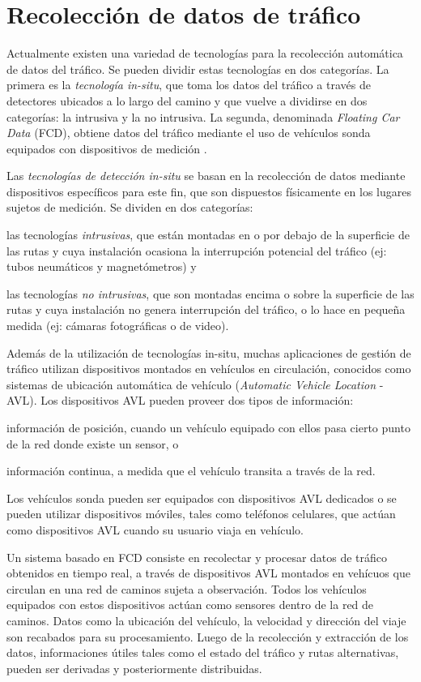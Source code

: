 \section{Recolección de datos de tráfico}
\label{sec:recoleccion_datos}

Actualmente existen una variedad de tecnologías para la recolección automática de datos del tráfico. Se pueden dividir estas tecnologías en dos categorías. La primera es la \emph{tecnología in-situ}, que toma los datos del tráfico a través de detectores ubicados a lo largo del camino y que vuelve a dividirse en dos categorías: la intrusiva y la no intrusiva. La segunda, denominada \emph{Floating Car Data} (FCD), obtiene datos del tráfico mediante el uso de vehículos sonda equipados con dispositivos de medición \cite{mimbela2003summary}.

Las \emph{tecnologías de detección in-situ} se basan en la recolección de datos mediante dispositivos específicos para este fin, que son dispuestos físicamente en los lugares sujetos de medición. Se dividen en dos categorías: \begin{enumerate*}[a)] \item las tecnologías \emph{intrusivas}, que están montadas en o por debajo de la superficie de las rutas y cuya instalación ocasiona la interrupción potencial del tráfico (ej: tubos neumáticos y magnetómetros) y \item las tecnologías \emph{no intrusivas}, que son montadas encima o sobre la superficie de las rutas y cuya instalación no genera interrupción del tráfico, o lo hace en pequeña medida (ej: cámaras fotográficas o de video).\end{enumerate*}

Además de la utilización de tecnologías in-situ, muchas aplicaciones de gestión de tráfico utilizan dispositivos montados en vehículos en circulación, conocidos como sistemas de ubicación automática de vehículo (\emph{Automatic Vehicle Location} - AVL). Los dispositivos AVL pueden proveer dos tipos de información: \begin{enumerate*}[a)]
\item información de posición, cuando un vehículo equipado con ellos pasa cierto punto de la red donde existe un sensor, o \item información continua, a medida que el vehículo transita a través de la red.
\end{enumerate*}
Los vehículos sonda pueden ser equipados con dispositivos AVL dedicados o se pueden utilizar dispositivos móviles, tales como teléfonos celulares, que actúan como dispositivos AVL cuando su usuario viaja en vehículo.  

Un sistema basado en FCD consiste en recolectar y procesar datos de tráfico obtenidos en tiempo real, a través de dispositivos AVL montados en vehícuos que circulan en una red de caminos sujeta a observación. Todos los vehículos equipados con estos dispositivos actúan como sensores dentro de la red de caminos. Datos como la ubicación del vehículo, la velocidad y dirección del viaje son recabados para su procesamiento. Luego de la recolección y extracción de los datos, informaciones útiles tales como el estado del tráfico y rutas alternativas, pueden ser derivadas y posteriormente distribuidas.


